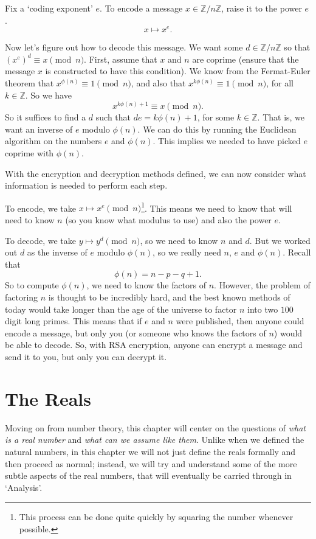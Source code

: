 \documentclass[a4paper]{scrartcl}
\begin{document}
Fix a `coding exponent' $e$.
To encode a message $x \in \mathbb{Z}/n\mathbb{Z}$, raise it to the power $e$.
$$
x \longmapsto x^e.
$$

Now let's figure out how to decode this message. We want some $d \in \mathbb{Z}/n\mathbb{Z}$ so that $(x^e)^d \equiv x \pmod{n}$. First, assume that $x$ and $n$ are coprime (ensure that the message $x$ is constructed to have this condition).
We know from the Fermat-Euler theorem that $x^{\phi(n)} \equiv 1 \pmod{n}$, and also that $x^{k \phi(n)} \equiv 1 \pmod{n}$, for all $k \in \mathbb{Z}$. So we have
$$
x^{k \phi(n) + 1} \equiv x \pmod{n}.
$$
So it suffices to find a $d$ such that $de = k \phi(n) + 1$, for some $k \in \mathbb{Z}$. That is, we want an inverse of $e$ modulo $\phi(n)$. We can do this by running the Euclidean algorithm on the numbers $e$ and $\phi(n)$. This implies we needed to have picked $e$ coprime with $\phi(n)$.

With the encryption and decryption methods defined, we can now consider what information is needed to perform each step.

To encode, we take $x \longmapsto x^e \pmod{n}$\footnote{This process can be done quite quickly by squaring the number whenever possible.}. This means we need to know that will need to know $n$ (so you know what modulus to use) and also the power $e$.

To decode, we take $y \longmapsto y^d \pmod{n}$, so we need to know $n$ and $d$. But we worked out $d$ as the inverse of $e$ modulo $\phi(n)$, so we really need $n$, $e$ and $\phi(n)$. Recall that
$$
\phi(n) = n - p - q + 1.
$$
So to compute $\phi(n)$, we need to know the factors of $n$.
However, the problem of factoring $n$ is thought to be incredibly hard, and the best known methods of today would take longer than the age of the universe to factor $n$ into two $100$ digit long primes. 
This means that if $e$ and $n$ were published, then anyone could encode a message, but only you (or someone who knows the factors of $n$) would be able to decode. So, with RSA encryption, anyone can encrypt a message and send it to you, but only you can decrypt it.


\section{The Reals}

Moving on from number theory, this chapter will center on the questions of \emph{what is a real number} and \emph{what can we assume like them}.
Unlike when we defined the natural numbers, in this chapter we will not just define the reals formally and then proceed as normal; instead, we will try and understand some of the more subtle aspects of the real numbers, that will eventually be carried through in `Analysis'.
\end{document}
